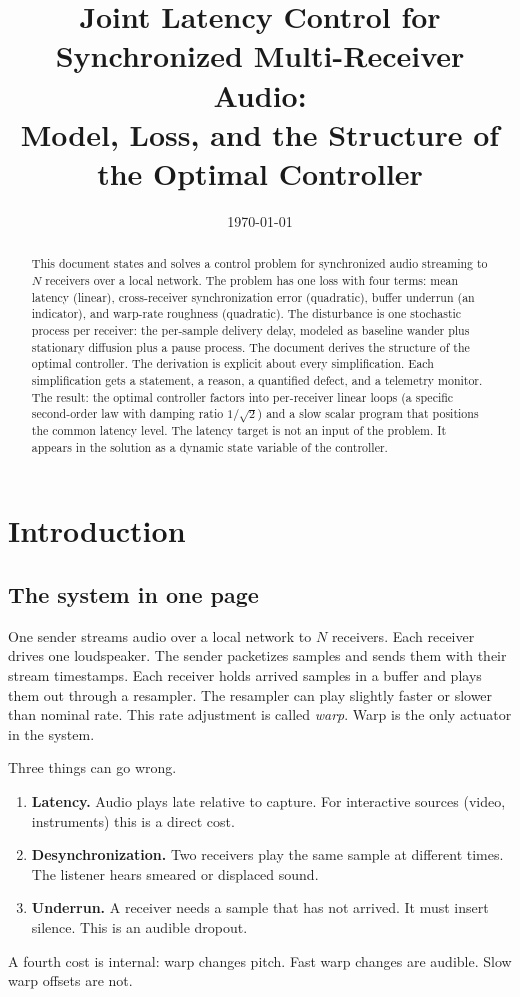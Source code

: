 \documentclass[11pt, a4paper]{article}
\title{Joint Latency Control for Synchronized Multi-Receiver Audio:\\
  Model, Loss, and the Structure of the Optimal Controller}
\author{}
\date{\today}
\theoremstyle{definition}
\theoremstyle{plain}
\theoremstyle{remark}
\begin{document}
\maketitle

\begin{abstract}
This document states and solves a control problem for synchronized audio
streaming to $N$ receivers over a local network.  The problem has one loss
with four terms: mean latency (linear), cross-receiver synchronization error
(quadratic), buffer underrun (an indicator), and warp-rate roughness
(quadratic).  The disturbance is one stochastic process per receiver: the
per-sample delivery delay, modeled as baseline wander plus stationary
diffusion plus a pause process.  The document derives the structure of the
optimal controller.  The derivation is explicit about every simplification.
Each simplification gets a statement, a reason, a quantified defect, and a
telemetry monitor.  The result: the optimal controller factors into
per-receiver linear loops (a specific second-order law with damping ratio
$1/\sqrt2$) and a slow scalar program that positions the common latency
level.  The latency target is not an input of the problem.  It appears in
the solution as a dynamic state variable of the controller.
\end{abstract}

\tableofcontents
\newpage

\section{Introduction}\label{sec:intro}

\subsection{The system in one page}\label{sec:system-one-page}

One sender streams audio over a local network to $N$ receivers.  Each
receiver drives one loudspeaker.  The sender packetizes samples and sends
them with their stream timestamps.  Each receiver holds arrived samples in
a buffer and plays them out through a resampler.  The resampler can play
slightly faster or slower than nominal rate.  This rate adjustment is
called \emph{warp}.  Warp is the only actuator in the system.

Three things can go wrong.
\begin{enumerate}[label=(\alph*)]
  \item \textbf{Latency.}  Audio plays late relative to capture.  For
    interactive sources (video, instruments) this is a direct cost.
  \item \textbf{Desynchronization.}  Two receivers play the same sample at
    different times.  The listener hears smeared or displaced sound.
  \item \textbf{Underrun.}  A receiver needs a sample that has not arrived.
    It must insert silence.  This is an audible dropout.
\end{enumerate}
A fourth cost is internal: warp changes pitch.  Fast warp changes are
audible.  Slow warp offsets are not.
\end{document}
